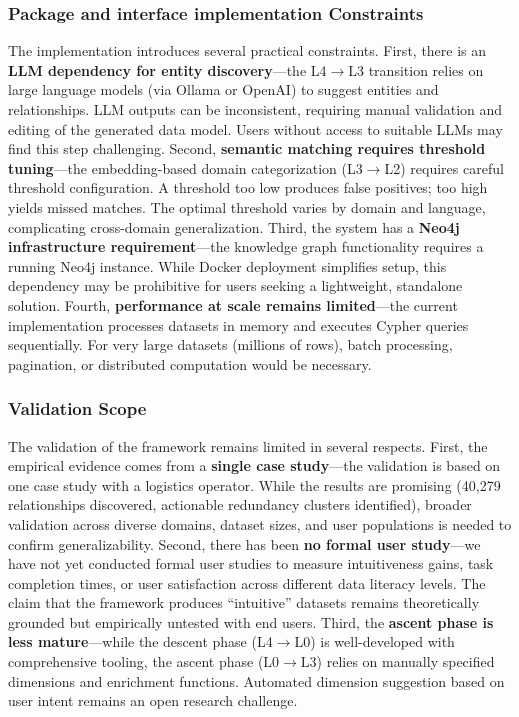 \documentclass[Afour,times,sageh]{sagej}
\begin{document}
\subsubsection{Package and interface implementation Constraints}

The implementation introduces several practical constraints. First, there is an \textbf{LLM dependency for entity discovery}---the L4$\to$L3 transition relies on large language models (via Ollama or OpenAI) to suggest entities and relationships. LLM outputs can be inconsistent, requiring manual validation and editing of the generated data model. Users without access to suitable LLMs may find this step challenging. Second, \textbf{semantic matching requires threshold tuning}---the embedding-based domain categorization (L3$\to$L2) requires careful threshold configuration. A threshold too low produces false positives; too high yields missed matches. The optimal threshold varies by domain and language, complicating cross-domain generalization. Third, the system has a \textbf{Neo4j infrastructure requirement}---the knowledge graph functionality requires a running Neo4j instance. While Docker deployment simplifies setup, this dependency may be prohibitive for users seeking a lightweight, standalone solution. Fourth, \textbf{performance at scale remains limited}---the current implementation processes datasets in memory and executes Cypher queries sequentially. For very large datasets (millions of rows), batch processing, pagination, or distributed computation would be necessary.

\subsubsection{Validation Scope}

The validation of the framework remains limited in several respects. First, the empirical evidence comes from a \textbf{single case study}---the validation is based on one case study with a logistics operator. While the results are promising (40,279 relationships discovered, actionable redundancy clusters identified), broader validation across diverse domains, dataset sizes, and user populations is needed to confirm generalizability. Second, there has been \textbf{no formal user study}---we have not yet conducted formal user studies to measure intuitiveness gains, task completion times, or user satisfaction across different data literacy levels. The claim that the framework produces ``intuitive'' datasets remains theoretically grounded but empirically untested with end users. Third, the \textbf{ascent phase is less mature}---while the descent phase (L4$\to$L0) is well-developed with comprehensive tooling, the ascent phase (L0$\to$L3) relies on manually specified dimensions and enrichment functions. Automated dimension suggestion based on user intent remains an open research challenge.
\end{document}
